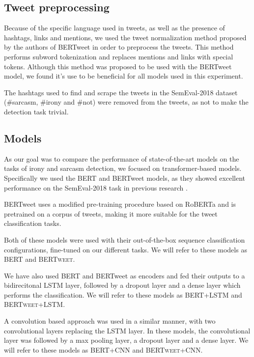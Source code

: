 \documentclass[10pt, a4paper]{article}
\begin{document}
\subsection{Tweet preprocessing}
Because of the specific language used in tweets, as well as the presence of hashtags, links and mentions, we used the
tweet normalization method proposed by the authors of BERTweet \citep{bertweet} in order to preprocess the tweets. This method
performs subword tokenization and replaces mentions and links with special tokens. Although this method was proposed to be 
used with the BERTweet model, we found it's use to be beneficial for all models used in this experiment.

The hashtags used to find and scrape the tweets in the SemEval-2018 dataset (\#sarcasm, \#irony and \#not) were removed
from the tweets, as not to make the detection task trivial.

\subsection{Models}\label{sec:models}

As our goal was to compare the performance of state-of-the-art models on the tasks of irony and sarcasm detection, we 
focused on transformer-based models. Specifically we used the BERT \citep{devlin-etal-2019-bert} and BERTweet \citep{bertweet} models,
as they showed excellent performance on the SemEval-2018 task in previous research \citep{transformers4irony-2020,bertweet}.

BERTweet uses a modified pre-training procedure based on RoBERTa \citep{roberta} and is pretrained on a corpus of tweets, 
making it more suitable for the tweet classification tasks.

Both of these models were used with their out-of-the-box sequence classification configurations, fine-tuned on our 
different tasks. We will refer to these models as \textsc{BERT} and \textsc{BERTweet}.

We have also used BERT and BERTweet as encoders and fed their outputs to a bidirecitonal LSTM layer, followed by 
a dropout layer and a dense layer which performs the classification. We will refer to these models as \textsc{BERT+LSTM}
and \textsc{BERTweet+LSTM}. 

A convolution based approach was used in a similar manner, with two convolutional layers
replacing the LSTM layer. In these models, the convolutional layer was followed by a max pooling layer, a dropout layer
and a dense layer. We will refer to these models as \textsc{BERT+CNN} and \textsc{BERTweet+CNN}.
\end{document}

